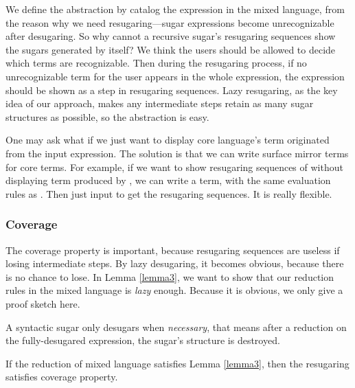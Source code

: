 We define the abstraction by catalog the expression in the mixed language, from the reason why we need resugaring---sugar expressions become unrecognizable after desugaring. So why cannot a recursive sugar's resugaring sequences show the sugars generated by itself? We think the users should be allowed to decide which terms are recognizable. Then during the resugaring process, if no unrecognizable term for the user appears in the whole expression, the expression should be shown as a step in resugaring sequences. Lazy resugaring, as the key idea of our approach, makes any intermediate steps retain as many sugar structures as possible, so the abstraction is easy.

One may ask what if we just want to display core language's term originated from the input expression. The solution is that we can write surface mirror terms for core terms. For example, if we want to show resugaring sequences of  without displaying  term produced by , we can write a  term, with the same evaluation rules as . Then just input  to get the resugaring sequences. It is really flexible.

\subsubsection{Coverage}
The coverage property is important, because resugaring sequences are useless if losing intermediate steps. By lazy desugaring, it becomes obvious, because there is no chance to lose. In Lemma \ref{lemma3}, we want to show that our reduction rules in the mixed language is \emph{lazy} enough. Because it is obvious, we only give a proof sketch here.
\begin{lemma}
\label{lemma3}
A syntactic sugar only desugars when \emph{necessary}, that means after a reduction on the fully-desugared expression, the sugar's structure is destroyed.
\end{lemma}

\begin{Def}[Coverage]
If the reduction of mixed language satisfies Lemma \ref{lemma3}, then the resugaring satisfies coverage property.
\end{Def}



